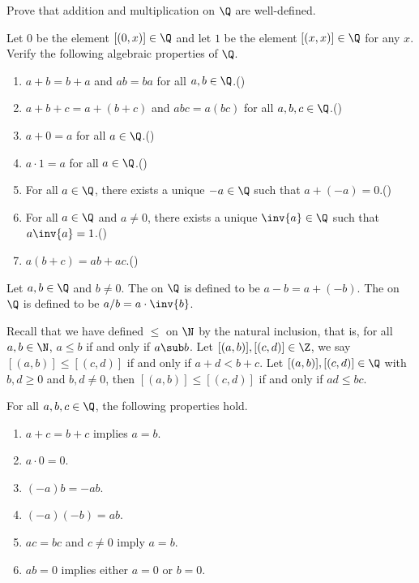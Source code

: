 \documentclass[10pt]{article}
\begin{document}
\begin{problem}
    Prove that addition and multiplication on $\Q$ are well-defined.
\end{problem}
\begin{problem}
    Let $0$ be the element $[(0,x)]\in\Q$ and let $1$ be the element $[(x,x)]\in\Q$ for any $x$. Verify the following algebraic properties of $\Q$.
    \begin{enumerate}
        \item $a+b=b+a$ and $ab=ba$ for all $a,b\in\Q$.\hfill()
        \item $a+b+c=a+(b+c)$ and $abc=a(bc)$ for all $a,b,c\in\Q$.\hfill()
        \item $a+0=a$ for all $a\in\Q$.\hfill()
        \item $a\cdot 1=a$ for all $a\in\Q$.\hfill()
        \item For all $a\in\Q$, there exists a unique $-a\in\Q$ such that $a+(-a)=0$.\hfill()
        \item For all $a\in\Q$ and $a\ne 0$, there exists a unique $\inv{a}\in\Q$ such that $a\inv{a}=1$.\hfill()
        \item $a(b+c)=ab+ac$.\hfill() 
    \end{enumerate}
\end{problem}
\begin{definition}
    Let $a,b\in\Q$ and $b\ne 0$. The  on $\Q$ is defined to be $a-b=a+(-b)$. The  on $\Q$ is defined to be $a/b=a\cdot\inv{b}$.
\end{definition}
\par
Recall that we have defined $\le$ on $\N$ by the natural inclusion, that is, for all $a,b\in\N$, $a\le b$ if and only if $a\sub b$. Let $[(a,b)],[(c,d)]\in\Z$, we say $[(a,b)]\le[(c,d)]$ if and only if $a+d<b+c$. Let $[(a,b)],[(c,d)]\in\Q$ with $b,d\ge 0$ and $b,d\ne 0$, then $[(a,b)]\le[(c,d)]$ if and only if $ad\le bc$.
\begin{proposition}
    For all $a,b,c\in\Q$, the following properties hold.
    \begin{enumerate}
        \item $a+c=b+c$ implies $a=b$.
        \item $a\cdot 0=0$.
        \item $(-a)b=-ab$.
        \item $(-a)(-b)=ab$.
        \item $ac=bc$ and $c\ne 0$ imply $a=b$.
        \item $ab=0$ implies either $a=0$ or $b=0$.
    \end{enumerate}
\end{proposition}
\end{document}
